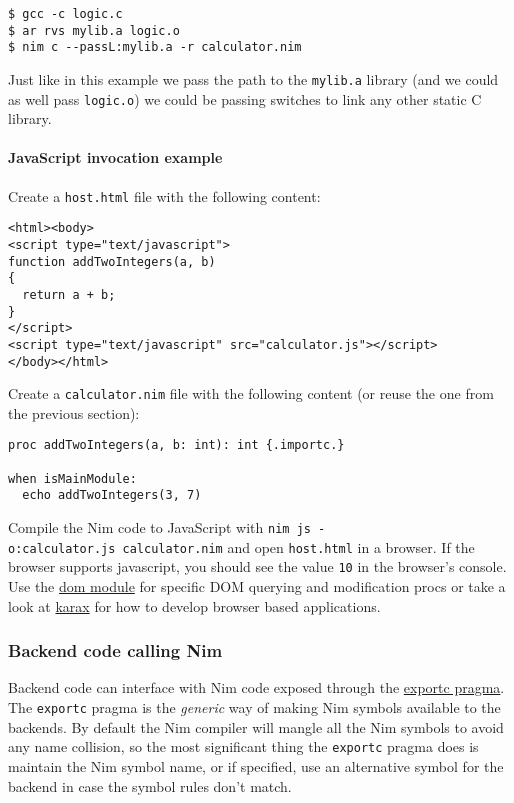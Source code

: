 \begin{verbatim}
$ gcc -c logic.c
$ ar rvs mylib.a logic.o
$ nim c --passL:mylib.a -r calculator.nim
\end{verbatim}

Just like in this example we pass the path to the \texttt{mylib.a}
library (and we could as well pass \texttt{logic.o}) we could be passing
switches to link any other static C library.

\hypertarget{javascript-invocation-example}{%
\paragraph{JavaScript invocation
example}\label{javascript-invocation-example}}

Create a \texttt{host.html} file with the following content:

\begin{verbatim}
<html><body>
<script type="text/javascript">
function addTwoIntegers(a, b)
{
  return a + b;
}
</script>
<script type="text/javascript" src="calculator.js"></script>
</body></html>
\end{verbatim}

Create a \texttt{calculator.nim} file with the following content (or
reuse the one from the previous section):

\begin{verbatim}
proc addTwoIntegers(a, b: int): int {.importc.}

when isMainModule:
  echo addTwoIntegers(3, 7)
\end{verbatim}

Compile the Nim code to JavaScript with
\texttt{nim\ js\ -o:calculator.js\ calculator.nim} and open
\texttt{host.html} in a browser. If the browser supports javascript, you
should see the value \texttt{10} in the browser's console. Use the
\href{dom.html}{dom module} for specific DOM querying and modification
procs or take a look at \href{https://github.com/pragmagic/karax}{karax}
for how to develop browser based applications.

\hypertarget{backend-code-calling-nim}{%
\subsubsection{Backend code calling
Nim}\label{backend-code-calling-nim}}

Backend code can interface with Nim code exposed through the
\href{manual.html\#foreign-function-interface-exportc-pragma}{exportc
pragma}. The \texttt{exportc} pragma is the \emph{generic} way of making
Nim symbols available to the backends. By default the Nim compiler will
mangle all the Nim symbols to avoid any name collision, so the most
significant thing the \texttt{exportc} pragma does is maintain the Nim
symbol name, or if specified, use an alternative symbol for the backend
in case the symbol rules don't match.

